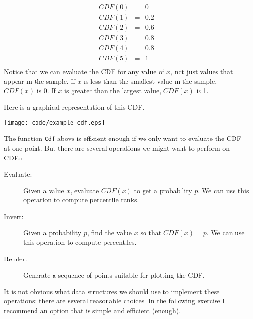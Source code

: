 \documentclass[10pt]{book}
\begin{document}
\begin{eqnarray*}
CDF(0) &=& 0    \\
CDF(1) &=& 0.2    \\
CDF(2) &=& 0.6    \\
CDF(3) &=& 0.8    \\
CDF(4) &=& 0.8    \\
CDF(5) &=& 1    \\
\end{eqnarray*}
%
Notice that we can evaluate the CDF for any value of $x$, not just
values that appear in the sample.
If $x$ is less than the smallest value in the sample, $CDF(x)$ is 0.
If $x$ is greater than the largest value, $CDF(x)$ is 1.

Here is a graphical representation of this CDF.

\beforefig
\centerline{\texttt{[image: code/example\_cdf.eps]}}
\afterfig

The function {\tt Cdf} above is efficient enough if we only want
to evaluate the CDF at one point.  But there are several operations
we might want to perform on CDFs:

\begin{description}

\item[Evaluate:] Given a value $x$, evaluate $CDF(x)$ to get a
probability $p$.  We can use this operation to compute percentile
ranks.

\item[Invert:] Given a probability $p$, find
the value $x$ so that $CDF(x) = p$.  We can use this operation
to compute percentiles.

\item[Render:] Generate a sequence of points suitable for plotting
the CDF.

\end{description}

It is not obvious what data structures we should use to implement
these operations; there are several reasonable choices.  In the
following exercise I recommend an option that is simple and efficient
(enough).
\end{document}
